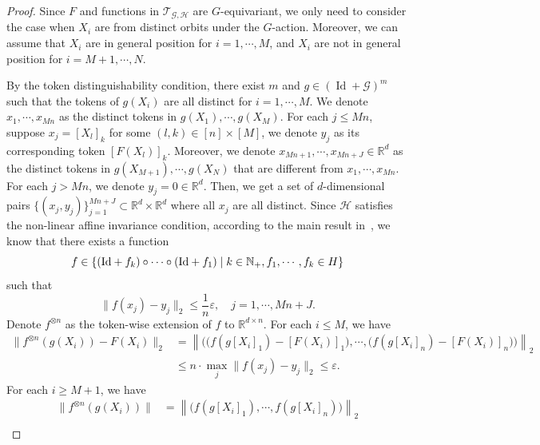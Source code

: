\documentclass{article}
\begin{document}
\begin{proof}
                                     Since $F$ and functions in $\mathcal T_{\mathcal G, \mathcal H}$ are $G$-equivariant, we only need to consider the case when $X_i$ are from distinct orbits under the $G$-action.
    Moreover, we can assume that $X_i$ are in general position for $i=1,\cdots, M$, and $X_i$ are not in general position for $i=M+1, \cdots, N$.

    By the token distinguishability condition, there exist $m$ and $g\in (\operatorname{Id}+\mathcal{G})^m$ such that the tokens of $g(X_i)$ are all distinct for $i=1,\cdots, M$.
    We denote $x_1,\cdots, x_{Mn}$ as the distinct tokens in $g(X_1),\cdots, g(X_M)$.
    For each $j\le Mn$, suppose $x_j=[X_l]_k$ for some $(l,k)\in [n]\times [M]$, we denote $y_j$ as its corresponding token $[F(X_l)]_k$. Moreover, we denote
 $x_{Mn+1},\cdots, x_{Mn+J}\in\mathbb R^d$ as the distinct tokens in $g(X_{M+1}),\cdots, g(X_N)$ that are different from $x_1,\cdots, x_{Mn}$. For each $j>Mn$, we denote $y_j=0\in\mathbb R^d$. Then, we get a set of $d$-dimensional pairs $\{(x_j, y_j)\}_{j=1}^{Mn+J}\subset \mathbb R^{d}\times \mathbb R^d$ where all $x_j$ are all distinct. Since $\mathcal H$ satisfies the non-linear affine invariance condition, according to the main result in~\cite{cheng2025interpolation}, we know that there exists a function
 \begin{equation}
    f\in \{(\mathrm{Id}+f_k)\circ \cdots \circ (\mathrm{Id}+f_1)\mid k\in \mathbb N_+,  f_1,\cdots, f_k\in\mathbb \mathcal H\}
 \end{equation}
such that
\begin{equation}
    \|f(x_j)-y_j\|_2\le \frac{1}{n}\varepsilon, \quad j=1,\cdots, Mn+J.
\end{equation}
Denote $f^{\otimes n}$ as the token-wise extension of $f$ to $\mathbb R^{d\times n}$. For each $i\le M$, we have
\begin{equation}
    \begin{aligned}
    \|f^{\otimes n}(g(X_i))-F(X_i)\|_2&=\left\|\Big(\big(f(g[X_i]_1)-[F(X_i)]_1\big), \cdots, \big(f(g[X_i]_n)-[F(X_i)]_n\big)\Big)\right\|_2\\
    &\le n\cdot \max_{j}\|f(x_j)-y_j\|_2\le \varepsilon.
    \end{aligned}
\end{equation}
For each $i\ge M+1$, we have
\begin{equation}
    \begin{aligned}
        \|f^{\otimes n}(g(X_i))\|&=\left\|\Big(f(g[X_i]_1), \cdots, f(g[X_i]_n)\Big)\right\|_2\\

\end{aligned}
\end{equation}
\end{proof}
\end{document}
